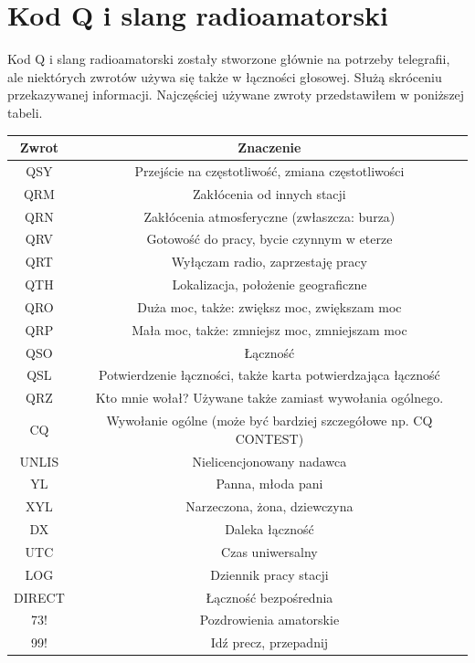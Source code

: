 \documentclass[a4paper,11pt]{article}
\begin{document}
\section{Kod Q i slang radioamatorski}
Kod Q i slang radioamatorski zostały stworzone głównie na potrzeby telegrafii, ale niektórych zwrotów używa się także w łączności głosowej. Służą skróceniu przekazywanej informacji. Najczęściej używane zwroty przedstawiłem w poniższej tabeli.
\begin{center}
\begin{tabular}{| c | c |}
\hline
\textbf{Zwrot} & \textbf{Znaczenie} \\ \hline
QSY & Przejście na częstotliwość, zmiana częstotliwości \\ \hline
QRM & Zakłócenia od innych stacji \\ \hline
QRN & Zakłócenia atmosferyczne (zwłaszcza: burza) \\ \hline
QRV & Gotowość do pracy, bycie czynnym w eterze \\ \hline
QRT & Wyłączam radio, zaprzestaję pracy \\ \hline
QTH & Lokalizacja, położenie geograficzne \\ \hline
QRO & Duża moc, także: zwiększ moc, zwiększam moc \\ \hline
QRP & Mała moc, także: zmniejsz moc, zmniejszam moc \\ \hline
QSO & Łączność \\ \hline
QSL & Potwierdzenie łączności, także karta potwierdzająca łączność \\ \hline
QRZ & Kto mnie wołał? Używane także zamiast wywołania ogólnego. \\ \hline
CQ & Wywołanie ogólne (może być bardziej szczegółowe np. CQ CONTEST) \\ \hline
UNLIS & Nielicencjonowany nadawca \\ \hline
YL & Panna, młoda pani \\ \hline
XYL & Narzeczona, żona, dziewczyna \\ \hline
DX & Daleka łączność \\ \hline
UTC & Czas uniwersalny \\ \hline
LOG & Dziennik pracy stacji \\ \hline
DIRECT & Łączność bezpośrednia \\ \hline
73! & Pozdrowienia amatorskie \\ \hline
99! & Idź precz, przepadnij \\ \hline
\end{tabular}
\end{center}
\end{document}
